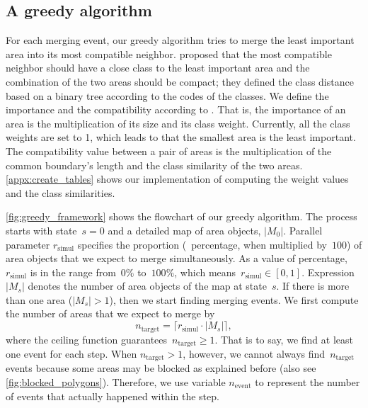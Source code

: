 \documentclass[twocolumn]{svjour3}          %
\begin{document}
\subsection{A greedy algorithm}
\label{sec:greedy_algo}

For each merging event, our greedy algorithm tries to 
merge the least important area into its most compatible neighbor.
\citet{Peng2020AreaAgg} proposed that 
the most compatible neighbor should have a close class
to the least important area
and the combination of the two areas should be compact;
they defined the class distance based on a binary tree
according to the codes of the classes.
We define the importance and the compatibility according to
\citet{vanPutten1998NewGAP}.
That is, the importance of an area is the multiplication 
of its size and its class weight.
Currently, all the class weights are set to 1,
which leads to that the smallest area is the least important.
The compatibility value between a pair of areas is 
the multiplication of the common boundary's length and 
the class similarity of the two areas.
\appx\ref{appx:create_tables} shows our implementation of
computing the weight values and the class similarities.



\fig\ref{fig:greedy_framework} shows the flowchart of our greedy algorithm.
The process starts with state~$s=0$ and a detailed map of area objects, $|M_0|$.
Parallel parameter $r_\mathrm{simul}$ specifies 
the proportion (\ie~percentage, when multiplied by~$100$) of area objects that
we expect to merge simultaneously.
As a value of percentage, 
$r_\mathrm{simul}$ is in the range from~$0\%$ to~$100\%$,
which means~$r_\mathrm{simul} \in [0,1]$.
Expression~$|M_s|$ denotes the number of area objects of the map at state~$s$.
If there is more than one area ($|M_s|>1$),
then we start finding merging events.
We first compute the number of areas that we expect to merge by
\begin{equation}
\label{eq:n_target}
n_\mathrm{target} =
\lceil r_\mathrm{simul} \cdot |M_s| \rceil,
\end{equation}
where the ceiling function guarantees~$n_\mathrm{target}\ge 1$.
That is to say, we find at least one event for each step.
When $n_\mathrm{target} > 1$, however,
we cannot always find~$n_\mathrm{target}$ events
because some areas may be blocked as explained before
(also see \fig\ref{fig:blocked_polygons}).
Therefore, we use variable $n_\mathrm{event}$
to represent the number of events that actually happened within the step. 
\end{document}
